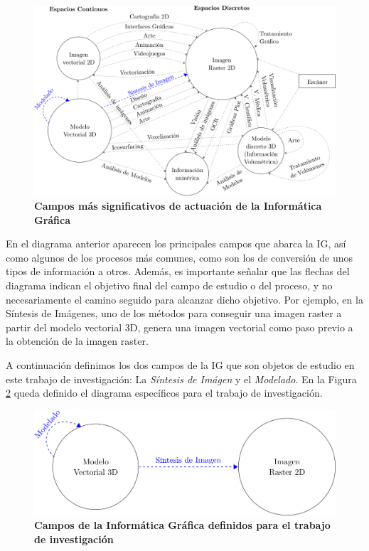 \begin{figure}[h]
\includegraphics[width=16cm]{Img/CPD/grafica1.png}
\centering
\caption{\textbf{\footnotesize{Campos más significativos de actuación de la Informática Gráfica}}}
\label{fig:grafica1}
\end{figure}

En el diagrama anterior aparecen los principales campos que abarca la IG, así como algunos de los procesos más comunes, como son los de conversión de unos tipos de información a otros. Además, es importante señalar que las flechas del diagrama indican el objetivo final del campo de estudio o del proceso, y no necesariamente el camino seguido para alcanzar dicho objetivo. Por ejemplo, en la Síntesis de Imágenes, uno de los métodos para conseguir una imagen raster a partir del modelo vectorial 3D, genera una imagen vectorial como paso previo a la obtención de la imagen raster.

A continuación definimos los dos campos de la IG que son objetos de estudio en este trabajo de investigación: La \textit{Síntesis de Imágen} y el \textit{Modelado}. En la Figura \ref{fig:grafica2} queda definido el diagrama específicos para el trabajo de investigación.



\begin{figure}[h]
\includegraphics[width=12cm]{Img/CPD/grafica2.png}
\centering
\caption{\textbf{\footnotesize{Campos de la Informática Gráfica definidos para el trabajo de investigación}}}
\label{fig:grafica2}
\end{figure}



